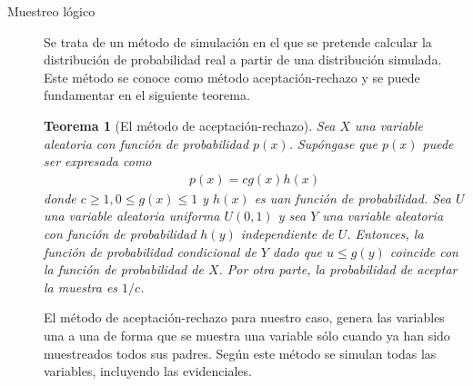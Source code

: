 \documentclass[12pt,a4paper]{article}
\newtheorem{theorem}{Teorema}
\begin{document}
\begin{description}
    \item[Muestreo lógico] Se trata de un método de simulación en el que se pretende calcular la distribución de probabilidad real a partir de una distribución simulada. Este método se conoce como método aceptación-rechazo y se puede fundamentar en el siguiente teorema.
    \begin{theorem}[El método de aceptación-rechazo]
        Sea $X$ una variable aleatoria con función de probabilidad $p(x)$. Supóngase que $p(x)$ puede ser expresada como 
        \begin{align}
            p(x) = c g(x) h(x)
        \end{align}
        donde $c \geq 1, 0 \leq g(x) \leq 1$ y $h(x)$ es uan función de probabilidad. Sea $U$ una variable aleatoria uniforma $U(0, 1)$ y sea $Y$ una variable aleatoria con función de probabilidad $h(y)$ independiente de $U$. Entonces, la función de probabilidad condicional de $Y$ dado que $u \leq g(y)$ coincide con la función de probabilidad de $X$. Por otra parte, la probabilidad de aceptar la muestra es $1/c$.
    \end{theorem}

    El método de aceptación-rechazo para nuestro caso, genera las variables una a una de forma que se muestra una variable sólo cuando ya han sido muestreados todos sus padres. Según este método se simulan todas las variables, incluyendo las evidenciales.


\end{description}
\end{document}
